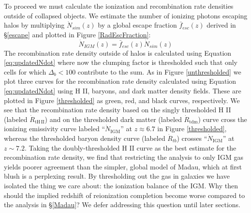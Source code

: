 To proceed we must calculate the ionization and recombination rate densities outside of collapsed objects. We estimate the number of ionizing photons escaping halos by multiplying  $\dot{N}_{sim}(z)$ by a global escape fraction $\bar{f}_{esc}(z)$ derived in \S\ref{escape} and plotted in Figure \ref{RadEscFraction}:
\begin{equation}
	\dot{N}_{IGM}(z)=\bar{f}_{esc}(z)\dot{N}_{sim}(z)
	\label{eq:ndot_igm}
\end{equation}
\noindent
The recombination rate density outside of halos is calculated using Equation \eqref{eq:updatedNdot} where now the clumping factor is thresholded such that only cells for which $\Delta_b < 100$ contribute to the sum. As in Figure \ref{unthresholded} we plot three curves for the recombination rate density calculated using Equation \eqref{eq:updatedNdot} using H {\footnotesize II}, baryons, and dark matter density fields. These are plotted in Figure \ref{thresholded} as green, red, and black curves, respectively. We see that the recombination rate density based on the singly thresholded H {\footnotesize II} (labeled $\dot{R}_\mathrm{tH\,II}$) and on the thresholded dark matter (labeled $\dot{R}_\mathrm{tdm}$) curve cross the ionizing emissivity curve labeled ``$\dot{N}_\mathrm{IGM}$'' at $z \approx 6.7$ in Figure \ref{thresholded}, whereas the thresholded baryon density curve (labeled $\dot{R}_{tb}$) crosses ``$\dot{N}_\mathrm{IGM}$'' at $z \sim 7.2$. Taking the doubly-thresholded H {\footnotesize II} curve as the best estimate for the recombination rate density, we find that restricting the analysis to only IGM gas yields poorer agreement than the simpler, global model of Madau, which at first blush is a perplexing result. By thresholding out the gas in galaxies we have isolated the thing we care about: the ionization balance of the IGM. Why then should the implied redshift of reionization completion become worse compared to the analysis in \S\ref{Madau}? We defer addressing this question until later sections. 


